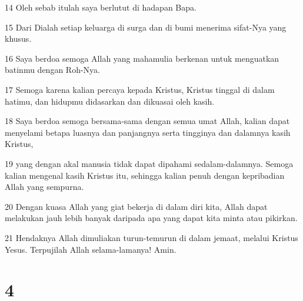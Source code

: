 \par 14 Oleh sebab itulah saya berlutut di hadapan Bapa.
\par 15 Dari Dialah setiap keluarga di surga dan di bumi menerima sifat-Nya yang khusus.
\par 16 Saya berdoa semoga Allah yang mahamulia berkenan untuk menguatkan batinmu dengan Roh-Nya.
\par 17 Semoga karena kalian percaya kepada Kristus, Kristus tinggal di dalam hatimu, dan hidupmu didasarkan dan dikuasai oleh kasih.
\par 18 Saya berdoa semoga bersama-sama dengan semua umat Allah, kalian dapat menyelami betapa luasnya dan panjangnya serta tingginya dan dalamnya kasih Kristus,
\par 19 yang dengan akal manusia tidak dapat dipahami sedalam-dalamnya. Semoga kalian mengenal kasih Kristus itu, sehingga kalian penuh dengan kepribadian Allah yang sempurna.
\par 20 Dengan kuasa Allah yang giat bekerja di dalam diri kita, Allah dapat melakukan jauh lebih banyak daripada apa yang dapat kita minta atau pikirkan.
\par 21 Hendaknya Allah dimuliakan turun-temurun di dalam jemaat, melalui Kristus Yesus. Terpujilah Allah selama-lamanya! Amin.

\chapter{4}

